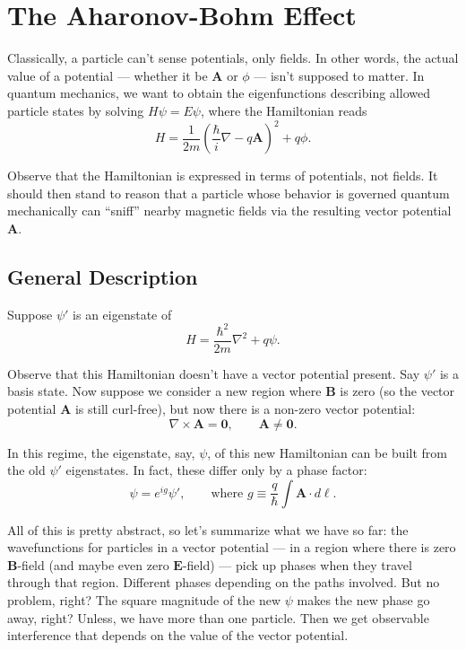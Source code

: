 \documentclass{article}
\numberwithin{equation}{section}
\begin{document}
\section{The Aharonov-Bohm Effect}

Classically, a particle can't sense potentials, only fields. In other words, the actual value of a potential --- whether it be $\bm{A}$ or $\phi$ --- isn't supposed to matter. In quantum mechanics, we want to obtain the eigenfunctions describing allowed particle states by solving $H \psi = E \psi$, where the Hamiltonian reads
\begin{equation*}
    H = \frac{1}{2m} \left( \frac{\hbar}{i} \nabla - q \bm{A} \right)^2 + q\phi.
\end{equation*}

Observe that the Hamiltonian is expressed in terms of potentials, not fields. It should then stand to reason that a particle whose behavior is governed quantum mechanically can ``sniff'' nearby magnetic fields via the resulting vector potential $\bm{A}$.

\subsection{General Description}

Suppose $\psi'$ is an eigenstate of
\begin{equation*}
	H = \frac{\hbar^2}{2m} \nabla^2 + q\psi.
\end{equation*}

Observe that this Hamiltonian doesn't have a vector potential present. Say $\psi'$ is a basis state. Now suppose we consider a new region where $\bm{B}$ is zero (so the vector potential $\bm{A}$ is still curl-free), but now there is a non-zero vector potential:
\begin{equation*}
	\nabla \times \bm{A} = \bm{0}, \qquad \bm{A} \neq \bm{0}.
\end{equation*}

In this regime, the eigenstate, say, $\psi$, of this new Hamiltonian can be built from the old $\psi'$ eigenstates. In fact, these differ only by a phase factor:
\begin{equation*}
	\psi = e^{ig} \psi', \qquad \text{where } g \equiv \frac{q}{\hbar} \int \bm{A} \cdot d\bm{\ell}.
\end{equation*}

All of this is pretty abstract, so let's summarize what we have so far: the wavefunctions for particles in a vector potential --- in a region where there is zero $\bm{B}$-field (and maybe even zero $\bm{E}$-field) --- pick up phases when they travel through that region. Different phases depending on the paths involved. But no problem, right? The square magnitude of the new $\psi$ makes the new phase go away, right? Unless, we have more than one particle. Then we get observable interference that depends on the value of the vector potential.
\end{document}
